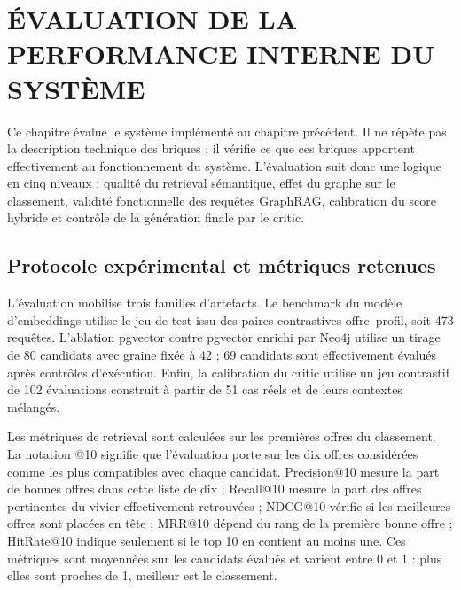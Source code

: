 \documentclass[12pt,twoside]{report}
\newcommand{\NCF}{\textsc{ncf}}
\newcommand{\LLM}{\textsc{llm}}
\begin{document}
\fi


\chapter{ÉVALUATION DE LA PERFORMANCE INTERNE DU SYSTÈME}
Ce chapitre évalue le système implémenté au chapitre précédent. Il ne répète pas la description technique des briques ; il vérifie ce que ces briques apportent effectivement au fonctionnement du système. L'évaluation suit donc une logique en cinq niveaux : qualité du retrieval sémantique, effet du graphe sur le classement, validité fonctionnelle des requêtes GraphRAG, calibration du score hybride et contrôle de la génération finale par le critic.


\section{Protocole expérimental et métriques retenues}

L'évaluation mobilise trois familles d'artefacts. Le benchmark du modèle d'embeddings utilise le jeu de test issu des paires contrastives offre--profil, soit 473 requêtes. L'ablation pgvector contre pgvector enrichi par Neo4j utilise un tirage de 80 candidats avec graine fixée à 42 ; 69 candidats sont effectivement évalués après contrôles d'exécution. Enfin, la calibration du critic utilise un jeu contrastif de 102 évaluations construit à partir de 51 cas réels et de leurs contextes mélangés.

Les métriques de retrieval sont calculées sur les premières offres du classement. La notation \og @10 \fg{} signifie que l'évaluation porte sur les dix offres considérées comme les plus compatibles avec chaque candidat. Precision@10 mesure la part de bonnes offres dans cette liste de dix ; Recall@10 mesure la part des offres pertinentes du vivier effectivement retrouvées ; NDCG@10 vérifie si les meilleures offres sont placées en tête ; MRR@10 dépend du rang de la première bonne offre ; HitRate@10 indique seulement si le top 10 en contient au moins une. Ces métriques sont moyennées sur les candidats évalués et varient entre 0 et 1 : plus elles sont proches de 1, meilleur est le classement.
\end{document}
